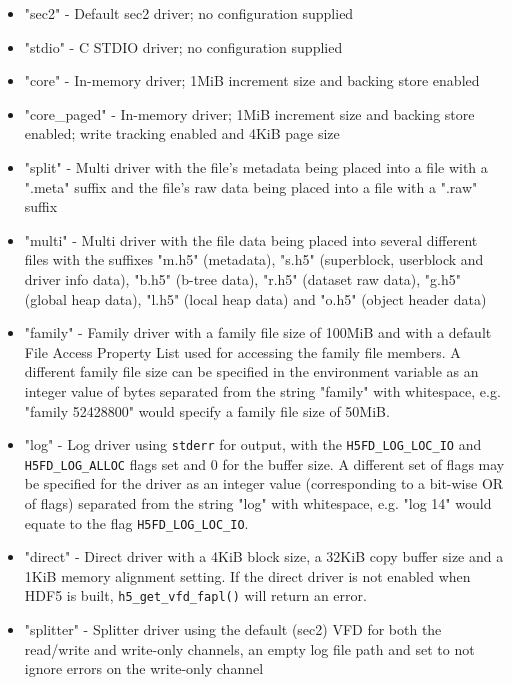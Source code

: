 \documentclass[../HDF5_RFC.tex]{subfiles}
\begin{document}
\begin{itemize}

    \item "sec2" - Default sec2 driver; no configuration supplied
    \item "stdio" - C STDIO driver; no configuration supplied
    \item "core" - In-memory driver; 1MiB increment size and backing store enabled
    \item "core\_paged" - In-memory driver; 1MiB increment size and backing store enabled; write tracking
          enabled and 4KiB page size
    \item "split" - Multi driver with the file's metadata being placed into a file with a ".meta" suffix
          and the file's raw data being placed into a file with a ".raw" suffix
    \item "multi" - Multi driver with the file data being placed into several different files with the 
          suffixes "m.h5" (metadata), "s.h5" (superblock, userblock and driver info data), "b.h5" (b-tree data), "r.h5" (dataset raw data), "g.h5" (global heap data), "l.h5" (local heap data) and "o.h5"
          (object header data)
    \item "family" - Family driver with a family file size of 100MiB and with a default File Access Property
          List used for accessing the family file members. A different family file size can be specified
          in the environment variable as an integer value of bytes separated from the string "family" with whitespace, e.g. "family 52428800" would specify a family file size of 50MiB.
    \item "log" - Log driver using \texttt{stderr} for output, with the \texttt{H5FD\_LOG\_LOC\_IO} and
          \texttt{H5FD\_LOG\_ALLOC} flags set and 0 for the buffer size. A different set of flags may be
          specified for the driver as an integer value (corresponding to a bit-wise OR of flags) separated from the string "log" with whitespace, e.g. "log 14" would equate to the flag
          \texttt{H5FD\_LOG\_LOC\_IO}.
    \item "direct" - Direct driver with a 4KiB block size, a 32KiB copy buffer size and a 1KiB memory
          alignment setting. If the direct driver is not enabled when HDF5 is built,
          \texttt{h5\_get\_vfd\_fapl()} will return an error.
    \item "splitter" - Splitter driver using the default (sec2) VFD for both the read/write and write-only
          channels, an empty log file path and set to not ignore errors on the write-only channel

\end{itemize}
\end{document}
